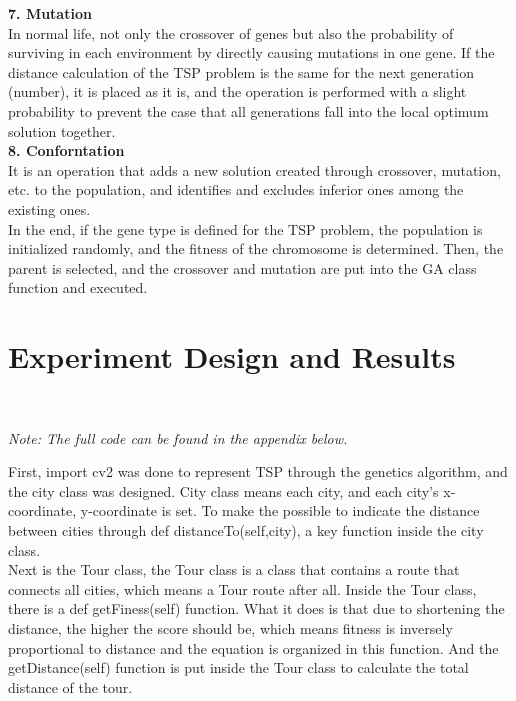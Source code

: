\documentclass[12pt]{article}
\begin{document}
\textbf{7. Mutation}\\

In normal life, not only the crossover of genes but also the probability of surviving in each environment by directly causing mutations in one gene. If the distance calculation of the TSP problem is the same for the next generation (number), it is placed as it is, and the operation is performed with a slight probability to prevent the case that all generations fall into the local optimum solution together.\\

\textbf{8. Conforntation}\\

It is an operation that adds a new solution created through crossover, mutation, etc. to the population, and identifies and excludes inferior ones among the existing ones.\\
In the end, if the gene type is defined for the TSP problem, the population is initialized randomly, and the fitness of the chromosome is determined. Then, the parent is selected, and the crossover and mutation are put into the GA class function and executed.

\section*{Experiment Design and Results}\\ 
    \begin{center}
        \textit{Note: The full code can be found in the appendix below.}\\
    \end{center}
First, import cv2 was done to represent TSP through the genetics algorithm, and the city class was designed. City class means each city, and each city’s x-coordinate, y-coordinate is set. To make the possible to indicate the distance between cities through def distanceTo(self,city), a key function inside the city class. \\

Next is the Tour class, the Tour class is a class that contains a route that connects all cities, which means a Tour route after all. Inside the Tour class, there is a def getFiness(self) function. What it does is that due to shortening the distance, the higher the score should be, which means fitness is inversely proportional to distance and the equation is organized in this function. And the getDistance(self) function is put inside the Tour class to calculate the total distance of the tour.\\
\end{document}
